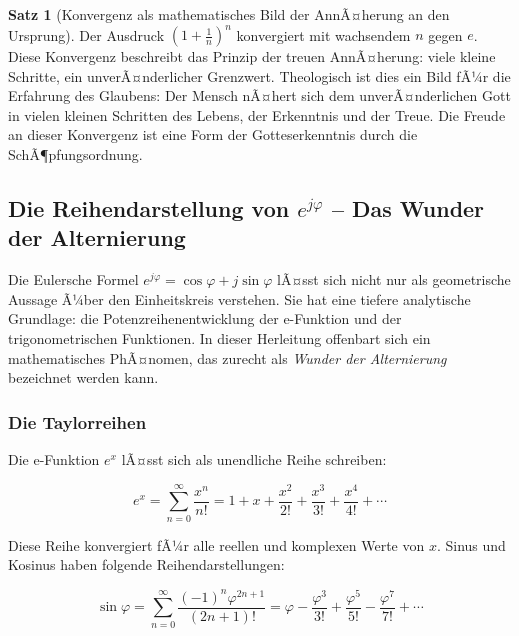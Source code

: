 ﻿\documentclass[a4paper,12pt]{article}
\theoremstyle{definition}
\newtheorem{theorem}{Satz}[section]
\begin{document}
\begin{theorem}[Konvergenz als mathematisches Bild der AnnÃ¤herung an den Ursprung]
	Der Ausdruck $\left(1+\frac{1}{n}\right)^n$ konvergiert mit wachsendem $n$
	gegen $e$. Diese Konvergenz beschreibt das Prinzip der treuen AnnÃ¤herung:
	viele kleine Schritte, ein unverÃ¤nderlicher Grenzwert. Theologisch ist dies
	ein Bild fÃ¼r die Erfahrung des Glaubens: Der Mensch nÃ¤hert sich dem unverÃ¤nderlichen
	Gott in vielen kleinen Schritten des Lebens, der Erkenntnis und der Treue.
	Die Freude an dieser Konvergenz ist eine Form der Gotteserkenntnis durch die
	SchÃ¶pfungsordnung.
\end{theorem}

\subsection{Die Reihendarstellung von $e^{j\varphi}$ -- Das Wunder der Alternierung}

Die Eulersche Formel $e^{j\varphi} = \cos\varphi + j\sin\varphi$ lÃ¤sst sich
nicht nur als geometrische Aussage Ã¼ber den Einheitskreis verstehen. Sie hat eine
tiefere analytische Grundlage: die Potenzreihenentwicklung der e-Funktion
und der trigonometrischen Funktionen. In dieser Herleitung offenbart sich ein
mathematisches PhÃ¤nomen, das zurecht als \textit{Wunder der Alternierung} bezeichnet
werden kann.

\subsubsection{Die Taylorreihen}

Die e-Funktion $e^x$ lÃ¤sst sich als unendliche Reihe schreiben:

\begin{equation}
	e^x = \sum_{n=0}^{\infty} \frac{x^n}{n!}
	= 1 + x + \frac{x^2}{2!} + \frac{x^3}{3!} + \frac{x^4}{4!} + \cdots
\end{equation}

Diese Reihe konvergiert fÃ¼r alle reellen und komplexen Werte von $x$.
Sinus und Kosinus haben folgende Reihendarstellungen:

\begin{equation}
	\sin\varphi = \sum_{n=0}^{\infty} \frac{(-1)^n \varphi^{2n+1}}{(2n+1)!}
	= \varphi - \frac{\varphi^3}{3!} + \frac{\varphi^5}{5!} - \frac{\varphi^7}{7!} + \cdots
\end{equation}
\end{document}
